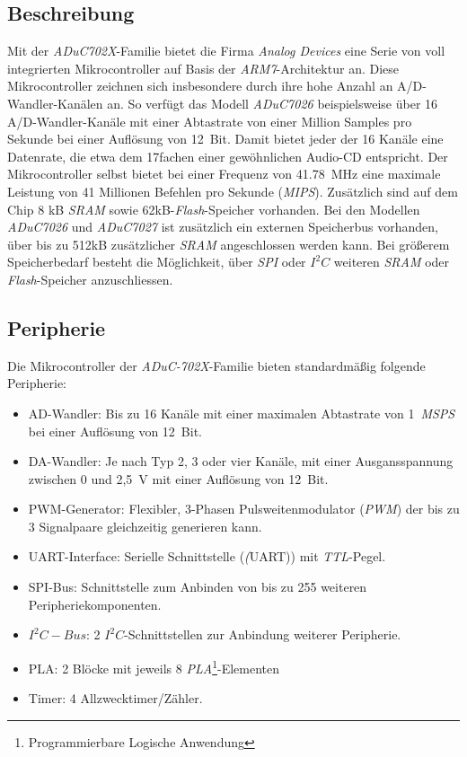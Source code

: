     \subsection{Beschreibung}
        Mit der \emph{ADuC702X}-Familie bietet die Firma \emph{Analog Devices} eine Serie von voll integrierten 
        Mikrocontroller auf Basis der \emph{ARM7}-Architektur an. Diese Mikrocontroller zeichnen sich insbesondere 
        durch ihre hohe Anzahl an A/D-Wandler-Kanälen an. So verfügt das Modell \emph{ADuC7026} beispielsweise
        über 16 A/D-Wandler-Kanäle mit einer Abtastrate von einer Million Samples pro Sekunde bei einer 
        Auflösung von 12~Bit. Damit bietet jeder der 16 Kanäle eine Datenrate, die etwa dem 17fachen einer 
        gewöhnlichen Audio-CD entspricht.  Der Mikrocontroller selbst bietet bei einer Frequenz von 
        41.78~MHz eine maximale Leistung von 41 Millionen Befehlen pro Sekunde (\emph{MIPS}). 
        Zusätzlich sind auf dem Chip 8 kB \emph{SRAM} sowie 62kB-\emph{Flash}-Speicher vorhanden. Bei den Modellen
        \emph{ADuC7026} und \emph{ADuC7027} ist zusätzlich ein externen Speicherbus vorhanden, über bis zu 512kB 
        zusätzlicher \emph{SRAM} angeschlossen werden kann. Bei größerem Speicherbedarf besteht die Möglichkeit, über 
        \emph{SPI} oder \emph{$I^2C$} weiteren \emph{SRAM} oder \emph{Flash}-Speicher anzuschliessen.

    \subsection{Peripherie}
        Die Mikrocontroller der \emph{ADuC-702X}-Familie bieten standardmäßig folgende Peripherie:

        \begin{itemize}
            \item{AD-Wandler:} Bis zu 16 Kanäle mit einer maximalen Abtastrate von 1~\emph{MSPS} bei einer Auflösung von 
                               12~Bit.
            \item{DA-Wandler:} Je nach Typ 2, 3 oder vier Kanäle, mit einer Ausgansspannung zwischen 0 und 2,5~V mit einer
                               Auflösung von 12~Bit.
            \item{PWM-Generator:} Flexibler, 3-Phasen Pulsweitenmodulator (\emph{PWM}) der bis zu 3 Signalpaare 
                                  gleichzeitig generieren kann.
            \item{UART-Interface:} Serielle Schnittstelle (\emph(UART)) mit \emph{TTL}-Pegel.
            \item{SPI-Bus:} Schnittstelle zum Anbinden von bis zu 255 weiteren Peripheriekomponenten.
            \item{$I^2C-Bus$:} 2 \emph{$I^2C$}-Schnittstellen zur Anbindung weiterer Peripherie.
            \item{PLA:} 2 Blöcke mit jeweils 8 \emph{PLA}\footnote{Programmierbare Logische Anwendung}-Elementen 
            \item{Timer:} 4 Allzwecktimer/Zähler.
        \end{itemize}
        
